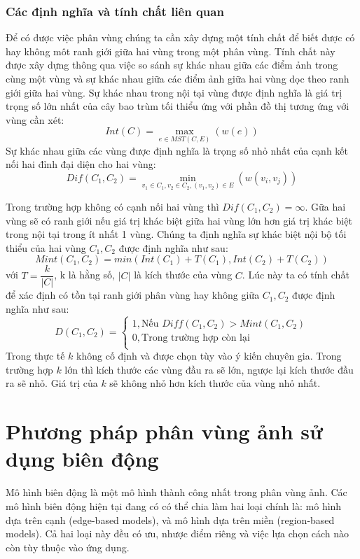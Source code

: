 \documentclass[14pt,oneside,a4paper]{extreport}
\begin{document}
\subsection{Các định nghĩa và tính chất liên quan}
Để có được việc phân vùng chúng ta cần xây dựng một tính chất để biết được có hay không môt ranh giới giữa hai vùng trong một phân vùng. Tính chất này được xây dựng thông qua việc so sánh sự khác nhau giữa các điểm ảnh trong cùng một vùng và sự khác nhau giữa các điểm ảnh giữa hai vùng dọc theo ranh giới giữa hai vùng.
Sự khác nhau trong nội tại vùng được định nghĩa là giá trị trọng số lớn nhất của cây bao trùm tối thiểu ứng với phần đồ thị tương ứng với vùng cần xét:
\begin{equation*}
Int(C)=\max_{e\in MST(C,E)}(w(e))
\end{equation*}
Sự khác nhau giữa các vùng được định nghĩa là trọng số nhỏ nhất của cạnh kết nối hai đỉnh đại diện cho hai vùng:
\begin{equation*}
Dif(C_1,C_2)=\min_{v_1\in C_1, v_2 \in C_2,(v_1, v_2) \in E}(w(v_i, v_j))
\end{equation*}

Trong trường hợp không có cạnh nối hai vùng thì $Dif(C_1,C_2)= \infty$. Gữa hai vùng sẽ có ranh giới nếu giá trị khác biệt giữa hai vùng lớn hơn giá trị khác biệt trong nội tại trong ít nhất 1 vùng. 
Chúng ta định nghĩa  sự khác biệt nội bộ tối thiểu của hai vùng $C_1, C_2$ được định nghĩa như sau: 
\begin{equation*}
Mint(C_1, C_2)= min(Int(C_1)+T(C_1),Int(C_2)+T(C_2))
\end{equation*}
với $T=\dfrac{k}{|C|}$, k là hằng số, $|C|$ là kích thước của vùng $C$. Lúc này ta có tính chất để xác định có tồn tại ranh giới phân vùng hay không giữa $C_1, C_2$  được định nghĩa như sau:
\begin{equation*}
D(C_1, C_2)=
\begin{cases}
 1, \textrm{Nếu } Diff(C_1, C_2)>Mint(C_1, C_2)\\
 0, \textrm{Trong trường hợp còn lại}\\
   \end{cases}
\end{equation*}
Trong thực tế $k$ không cố định và được chọn tùy vào ý kiến chuyên gia. Trong trường hợp $ k$ lớn thì kích thước các vùng đầu ra sẽ lớn, ngược lại kích thước đầu ra sẽ nhỏ. Giá trị của $k$ sẽ không nhỏ hơn kích thước  của vùng nhỏ nhất.
\chapter{Phương pháp phân vùng ảnh sử dụng biên động}
Mô hình biên động là một mô hình thành công nhất trong phân vùng ảnh. Các mô hình biên động hiện tại đang có có thể chia làm hai loại chính là: mô hình dựa trên cạnh (edge-based models), và mô hình dựa trên miền (region-based models). Cả hai loại này đều có ưu, nhược điểm riêng và việc lựa chọn cách nào còn tùy thuộc vào ứng dụng.
\end{document}

